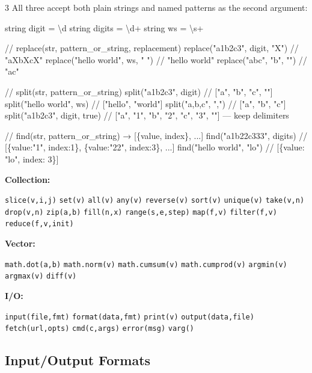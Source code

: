 \documentclass[8pt,landscape,a4paper,oneside]{article}
\newenvironment{Shaded}{%
  \begin{snugshade}%
  \vspace{0.4\baselineskip}%
  \fontsize{9}{10}\selectfont%
  \setlength{\parskip}{0pt}%
  \setlength{\topsep}{0pt}%
  \setlength{\partopsep}{0pt}%
}{%
  \vspace{0.01\baselineskip}%
  \end{snugshade}%
}
\newcommand{\NormalTok}[1]{#1}
\begin{document}
\begin{multicols*}{3}
All three accept both plain strings and named patterns as the second
argument:

\begin{Shaded}
\begin{Highlighting}[]
\NormalTok{string digit = \textbackslash{}d}
\NormalTok{string digits = \textbackslash{}d+}
\NormalTok{string ws = \textbackslash{}s+}

\NormalTok{// replace(str, pattern\_or\_string, replacement)}
\NormalTok{replace("a1b2c3", digit, "X")      // "aXbXcX"}
\NormalTok{replace("hello   world", ws, " ")  // "hello world"}
\NormalTok{replace("abc", "b", "")            // "ac"}

\NormalTok{// split(str, pattern\_or\_string)}
\NormalTok{split("a1b2c3", digit)           // ["a", "b", "c", ""]}
\NormalTok{split("hello   world", ws)       // ["hello", "world"]}
\NormalTok{split("a,b,c", ",")              // ["a", "b", "c"]}
\NormalTok{split("a1b2c3", digit, true)         }
\NormalTok{// ["a", "1", "b", "2", "c", "3", ""] — keep delimiters}

\NormalTok{// find(str, pattern\_or\_string) → [\{value, index\}, ...]}
\NormalTok{find("a1b22c333", digits)            }
\NormalTok{// [\{value:"1", index:1\}, \{value:"22", index:3\}, ...]}
\NormalTok{find("hello world", "lo")  // [\{value: "lo", index: 3\}]}
\end{Highlighting}
\end{Shaded}

\textbf{Collection:}

\texttt{slice(v,i,j)} \texttt{set(v)} \texttt{all(v)} \texttt{any(v)}
\texttt{reverse(v)} \texttt{sort(v)} \texttt{unique(v)}
\texttt{take(v,n)} \texttt{drop(v,n)} \texttt{zip(a,b)}
\texttt{fill(n,x)} \texttt{range(s,e,step)} \texttt{map(f,v)}
\texttt{filter(f,v)} \texttt{reduce(f,v,init)}

\textbf{Vector:}

\texttt{math.dot(a,b)} \texttt{math.norm(v)} \texttt{math.cumsum(v)}
\texttt{math.cumprod(v)} \texttt{argmin(v)} \texttt{argmax(v)}
\texttt{diff(v)}

\textbf{I/O:}

\texttt{input(file,fmt)} \texttt{format(data,fmt)} \texttt{print(v)}
\texttt{output(data,file)} \texttt{fetch(url,opts)} \texttt{cmd(c,args)}
\texttt{error(msg)} \texttt{varg()}

\subsection{Input/Output Formats}\label{inputoutput-formats}


\end{multicols*}
\end{document}
